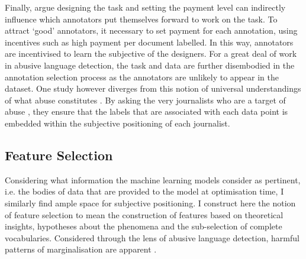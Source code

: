Finally, \citet{Sabou:2014} argue  designing the task and setting the payment level can indirectly influence which annotators put themselves forward to work on the task.
To attract `good' annotators, it necessary to set payment for each annotation, using incentives such as high payment per document labelled.
In this way, annotators are incentivised to learn the subjective  of the designers.
For a great deal of work in abusive language detection, the task and data are further disembodied in the annotation selection process as the annotators are unlikely to appear in the dataset. 
One study however diverges from this notion of universal understandings of what abuse constitutes \citep{Arora:2020}.
By asking the very journalists who are a target of abuse , they ensure that the labels that are associated with each data point is embedded within the subjective positioning of each journalist.


\subsection{Feature Selection}
Considering what information the machine learning models consider as pertinent, i.e. the bodies of data that are provided to the model at optimisation time, I similarly find ample space for subjective positioning.
I construct here the notion of feature selection to mean the construction of features based on theoretical insights, hypotheses about the phenomena and  the sub-selection of complete vocabularies.
Considered through the lens of abusive language detection, harmful patterns of marginalisation are apparent .

